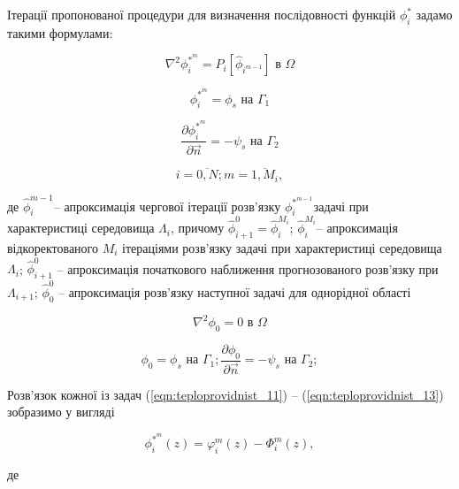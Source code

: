 Ітерації пропонованої процедури для визначення послідовності функцій $\phi_{i}^{*}$ задамо такими формулами:

\begin{equation}
    \label{eqn:teploprovidnist_11}
    \nabla^{2}{\phi_{i}^{{*}^{m}} = P_{i}}\left\lbrack {\hat{\phi}}_{i^{m - 1}} \right\rbrack  \text{ в } \Omega
\end{equation}

\begin{equation}
    \label{eqn:teploprovidnist_12}
    \phi_{i}^{{*}^{m}} = \phi_{s} \text{ на } \Gamma_{1}
\end{equation}

\begin{equation}
    \label{eqn:teploprovidnist_13}
    \frac{\partial\phi_{i}^{{*}^{m}}}{\partial\overrightarrow{n}} = {- \psi_{s}} \text{ на } \Gamma_{2}
\end{equation}

\[i = \overline{0,N}; m = \overline{1,M_{i}},\]

\noindent де $\hat{\phi}_{i}^{m - 1}$-- апроксимація чергової ітерації розв'язку $\phi_{i}^{{*}^{m - 1}}$задачі при
характеристиці середовища $\Lambda_{i}$, причому ${\hat{\phi}}_{i + 1}^{0} = {\hat{\phi}}_{i}^{M_{i}}$;
$\hat{\phi}_{i}^{M_{i}}$-- апроксимація відкоректованого $M_{i}$ ітераціями розв'язку задачі при характеристиці
середовища $\Lambda_{i}$; $\hat{\phi}_{i + 1}^{0}$ -- апроксимація початкового наближення прогнозованого розв'язку при
$\Lambda_{i + 1}$; $\hat{\phi}_{0}^{0}$ -- апроксимація розв'язку наступної задачі для однорідної області

\begin{equation*}
    \nabla^{2}\phi_{0} = 0 \text{ в } \Omega
\end{equation*}

\begin{equation*}
    \phi_{0} = \phi_{s} \text{ на } \Gamma_{1}; 
    \frac{\partial\phi_{0}}{\partial\overrightarrow{n}} = {- \psi_{s}} \text{ на } \Gamma_{2};
\end{equation*}

Розв'язок кожної із задач (\ref{eqn:teploprovidnist_11}) -- (\ref{eqn:teploprovidnist_13}) зобразимо у вигляді

\begin{equation*}
    \phi_{i}^{{*}^{m}}{(z) = \varphi_{i}^{m}}{(z) - \Phi_{i}^{m}}(z),
\end{equation*}

\noindent де

